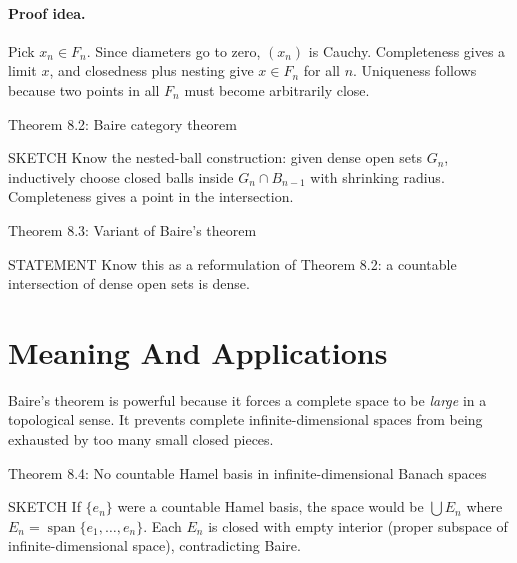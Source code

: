 \documentclass[header={Lecture 5 Exam Study Notes}]{study-note}
\begin{document}
\paragraph{Proof idea.}
Pick $x_n\in F_n$. Since diameters go to zero, $(x_n)$ is Cauchy. Completeness gives a limit $x$, and closedness plus nesting give $x\in F_n$ for all $n$. Uniqueness follows because two points in all $F_n$ must become arbitrarily close.

\begin{thmbox}{Theorem 8.2: Baire category theorem}
\thmBaireCategory
\end{thmbox}

\begin{prooflevelbox}{SKETCH}
Know the nested-ball construction: given dense open sets $G_n$, inductively choose closed balls inside $G_n\cap B_{n-1}$ with shrinking radius. Completeness gives a point in the intersection.
\end{prooflevelbox}

\begin{thmbox}{Theorem 8.3: Variant of Baire's theorem}
\thmBaireVariant
\end{thmbox}

\begin{prooflevelbox}{STATEMENT}
Know this as a reformulation of Theorem 8.2: a countable intersection of dense open sets is dense.
\end{prooflevelbox}

\section{Meaning And Applications}

\begin{focusbox}
Baire's theorem is powerful because it forces a complete space to be \emph{large} in a topological sense. It prevents complete infinite-dimensional spaces from being exhausted by too many small closed pieces.
\end{focusbox}

\begin{thmbox}{Theorem 8.4: No countable Hamel basis in infinite-dimensional Banach spaces}
\thmNoCountableHamelBasis
\end{thmbox}

\begin{prooflevelbox}{SKETCH}
If $\{e_n\}$ were a countable Hamel basis, the space would be $\bigcup E_n$ where $E_n=\operatorname{span}\{e_1,\dots,e_n\}$. Each $E_n$ is closed with empty interior (proper subspace of infinite-dimensional space), contradicting Baire.
\end{prooflevelbox}
\end{document}
